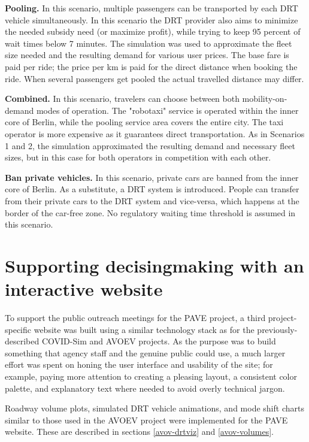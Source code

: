 \textbf{Pooling.} In this scenario, multiple passengers can be transported by each DRT vehicle simultaneously. In this scenario the DRT provider also aims to minimize the needed subsidy need (or maximize profit),  while trying to keep 95 percent of wait times below 7 minutes. The simulation was used to approximate the fleet size needed and the resulting demand for various user prices. The base fare is paid per ride; the price per km is paid for the direct distance when booking the ride. When several passengers get pooled the actual travelled distance may differ.

\textbf{Combined.} In this scenario, travelers can choose between both mobility-on-demand modes of operation. The "robotaxi" service is operated within the inner core of Berlin, while the pooling service area covers the entire city. The taxi operator is more expensive as it guarantees direct transportation. As in Scenarios 1 and 2, the simulation approximated the resulting demand and necessary fleet sizes, but in this case for both operators in competition with each other.

\textbf{Ban private vehicles.} In this scenario, private cars are banned from the inner core of Berlin. As a substitute, a DRT system is introduced. People can transfer from their private cars to the DRT system and vice-versa, which happens at the border of the car-free zone. No regulatory waiting time threshold is assumed in this scenario.

\section{Supporting decisingmaking with an interactive website}
\label{pave-site-features}

To support the public outreach meetings for the PAVE project, a third project-specific website was built using a similar technology stack as for the previously-described COVID-Sim and AVOEV projects. As the purpose was to build something that agency staff and the genuine public could use, a much larger effort was spent on honing the user interface and usability of the site; for example, paying more attention to creating a pleasing layout, a consistent color palette, and explanatory text where needed to avoid overly technical jargon.

Roadway volume plots, simulated DRT vehicle animations, and mode shift charts similar to those used in the AVOEV project were implemented for the PAVE website. These are described in sections \ref{avov-drtviz} and \ref{avov-volumes}.

